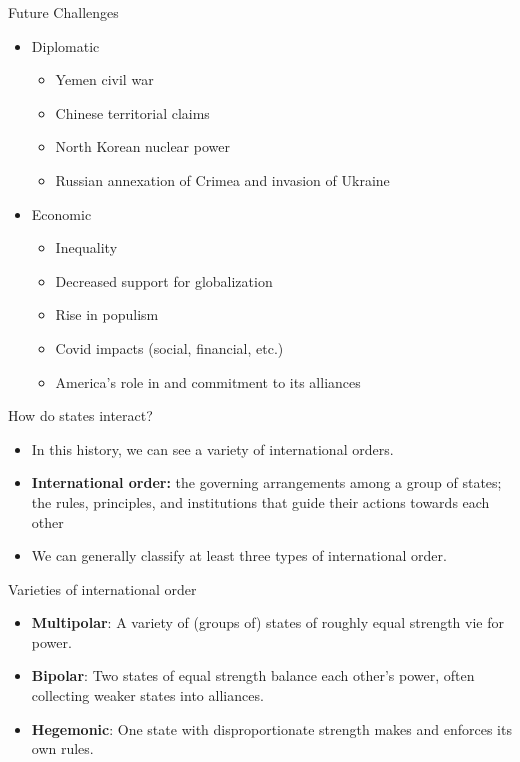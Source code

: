 \documentclass{beamer}
\begin{document}
\begin{frame}{\LARGE Future Challenges}
	\begin{itemize}
		\item Diplomatic
		\begin{itemize}
			\item Yemen civil war
			\item Chinese territorial claims
			\item North Korean nuclear power
			\item Russian annexation of Crimea and invasion of Ukraine \pause
		\end{itemize}
	\end{itemize}
	\begin{itemize}
		\item Economic
		\begin{itemize}
			\item Inequality
			\item Decreased support for globalization
			\item Rise in populism
			\item Covid impacts (social, financial, etc.)
			\item America's role in and commitment to its alliances			
		\end{itemize}
	\end{itemize}
\end{frame}

\begin{frame}{\LARGE How do states interact?}
\begin{itemize} 
	\item In this history, we can see a variety of international orders. \pause
    \item \textbf{International order:} the governing arrangements among a group of states; the rules, principles, and institutions that guide their actions towards each other \pause
    \item We can generally classify at least three types of international order.
\end{itemize}
\end{frame}

\begin{frame}{\LARGE Varieties of international order}
\begin{itemize}
    \item \textbf{Multipolar}: A variety of (groups of) states of roughly equal strength vie for power. \pause
    \item \textbf{Bipolar}: Two states of equal strength balance each other's power, often collecting weaker states into alliances. \pause
    \item \textbf{Hegemonic}: One state with disproportionate strength makes and enforces its own rules.
    
\end{itemize}
\end{frame}
\end{document}
